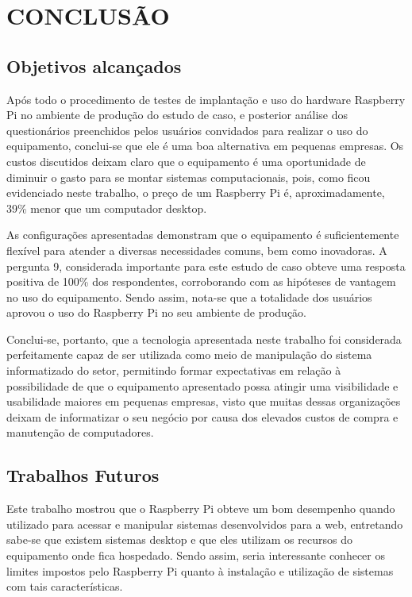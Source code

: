 \chapter{CONCLUSÃO}

\section{Objetivos alcançados}

Após todo o procedimento de testes de implantação e uso do hardware Raspberry Pi no ambiente de produção do estudo de caso, e posterior análise dos questionários preenchidos pelos usuários convidados para realizar o uso do equipamento, conclui-se que ele é uma boa alternativa em pequenas empresas.
Os custos discutidos deixam claro que o equipamento é uma oportunidade de diminuir o gasto para se montar sistemas computacionais, pois, como ficou evidenciado neste trabalho, o preço de um Raspberry Pi é, aproximadamente, 39\% menor que um computador desktop.

As configurações apresentadas demonstram que o equipamento é suficientemente flexível para atender a diversas necessidades comuns, bem como inovadoras.
A pergunta 9, considerada importante para este estudo de caso obteve uma resposta positiva de 100\% dos respondentes, corroborando com as hipóteses de vantagem no uso do equipamento. Sendo assim, nota-se que a totalidade dos usuários aprovou o uso do Raspberry Pi no seu ambiente de produção.

Conclui-se, portanto, que a tecnologia apresentada neste trabalho foi considerada perfeitamente capaz de ser utilizada como meio de manipulação do sistema informatizado do setor, permitindo formar expectativas em relação à possibilidade de que o equipamento apresentado possa atingir uma visibilidade e usabilidade maiores em pequenas empresas, visto que muitas dessas organizações deixam de informatizar o seu negócio por causa dos elevados custos de compra e manutenção de computadores.

\section{Trabalhos Futuros}

Este trabalho mostrou que o Raspberry Pi obteve um bom desempenho quando utilizado para acessar e manipular sistemas desenvolvidos para a web, entretando sabe-se que existem sistemas desktop e que eles utilizam os recursos do equipamento onde fica hospedado. Sendo assim, seria interessante conhecer os limites impostos pelo Raspberry Pi quanto à instalação e utilização de sistemas com tais características.
